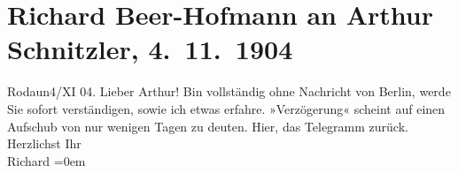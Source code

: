 

         \renewcommand{\erwaehnteOrte}{Orte: Berlin, Rodaun, Wien}
         \renewcommand{\erwaehnteWerke}{}
               \section[Richard Beer-Hofmann an Arthur Schnitzler, 4. 11. 1904]{ Richard Beer-Hofmann an Arthur Schnitzler, 4. 11. 1904}\nopagebreak{}\rehead{ }\begin{ledgroupsized}[t]{13cm}\normalsize\beginnumbering \toendnotes[C]{\smallbreak\pagebreak[2]} 
\pstart
           \raggedleft{}{\pb}Rodaun4/XI 04.\pend
           \pstart
           Lieber Arthur! Bin vollständig ohne Nachricht von Berlin, werde Sie sofort verständigen, sowie ich etwas erfahre.
               »Verzögerung« scheint auf einen Aufschub von nur wenigen Tagen zu deuten. Hier, das
               Telegramm zurück.\pend
           \pstart
           Herzlichst Ihr{\\[\baselineskip]}\spacefill\mbox{Richard}\pend
           \leftskip=0em{}
         
         \endnumbering{}\end{ledgroupsized}  \newcommand{\dateiname}{L01466}\newcommand{\titel}{Richard Beer-Hofmann an Arthur Schnitzler, 4. 11. 1904}\newcommand{\editorInnen}{Martin Anton Müller und Gerd-Hermann Susen}
      